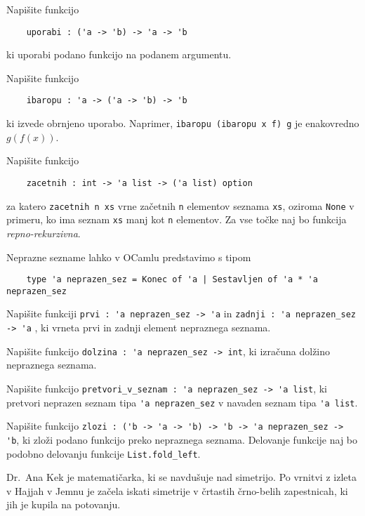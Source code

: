 \documentclass[arhiv]{../izpit}
\begin{document}

\naloga[]

\podnaloga
Napišite funkcijo
\begin{verbatim}
    uporabi : ('a -> 'b) -> 'a -> 'b
\end{verbatim}
ki uporabi podano funkcijo na podanem argumentu.

\podnaloga
Napišite funkcijo
\begin{verbatim}
    ibaropu : 'a -> ('a -> 'b) -> 'b
\end{verbatim}
ki izvede obrnjeno uporabo. Naprimer, \verb|ibaropu (ibaropu x f) g| je enakovredno $g (f (x))$.

\podnaloga
Napišite funkcijo
\begin{verbatim}
    zacetnih : int -> 'a list -> ('a list) option
\end{verbatim}
za katero \verb|zacetnih n xs| vrne začetnih \verb|n| elementov seznama \verb|xs|, oziroma \verb|None| v primeru, ko ima seznam \verb|xs| manj kot \verb|n| elementov. Za vse točke naj bo funkcija \emph{repno-rekurzivna}.

\naloga[]
Neprazne sezname lahko v OCamlu predstavimo s tipom
\begin{verbatim}
    type 'a neprazen_sez = Konec of 'a | Sestavljen of 'a * 'a neprazen_sez
\end{verbatim}

\podnaloga
Napišite funkciji \verb|prvi : 'a neprazen_sez -> 'a| in \verb|zadnji : 'a neprazen_sez -> 'a| , ki vrneta prvi in zadnji element nepraznega seznama.

\podnaloga
Napišite funkcijo \verb|dolzina : 'a neprazen_sez -> int|, ki izračuna dolžino nepraznega seznama.

\podnaloga
Napišite funkcijo \verb|pretvori_v_seznam : 'a neprazen_sez -> 'a list|, ki pretvori neprazen seznam tipa \verb|'a neprazen_sez| v navaden seznam tipa \verb|'a list|.

\podnaloga
Napišite funkcijo \verb|zlozi : ('b -> 'a -> 'b) -> 'b -> 'a neprazen_sez -> 'b|, ki zloži podano funkcijo preko nepraznega seznama. Delovanje funkcije naj bo
podobno delovanju funkcije \verb|List.fold_left|.

\naloga[]
Dr.~Ana Kek je matematičarka, ki se navdušuje nad simetrijo. Po vrnitvi z izleta v Hajjah v Jemnu je začela iskati simetrije v črtastih črno-belih zapestnicah, ki jih je kupila na potovanju.
\end{document}
